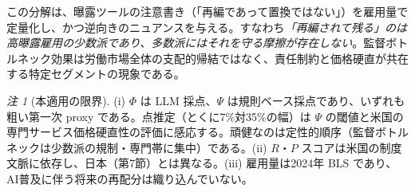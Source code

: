 \documentclass[11pt]{article}
\theoremstyle{plain}
\theoremstyle{definition}
\theoremstyle{remark}
\newtheorem*{rmk}{注}
\begin{document}
この分解は、曝露ツールの注意書き（「再編であって置換ではない」）を雇用量で定量化し、かつ逆向きのニュアンスを与える。すなわち\emph{「再編されて残る」のは高曝露雇用の少数派であり、多数派にはそれを守る摩擦が存在しない}。監督ボトルネック効果は労働市場全体の支配的帰結ではなく、責任制約と価格硬直が共在する特定セグメントの現象である。

\begin{rmk}[本適用の限界]
(i) $\Phi$ は LLM 採点、$\Psi$ は規則ベース採点であり、いずれも粗い第一次 proxy である。点推定（とくに7\%対35\%の幅）は $\Psi$ の閾値と米国の専門サービス価格硬直性の評価に感応する。頑健なのは定性的順序（監督ボトルネックは少数派の規制・専門帯に集中）である。(ii) $R$・$P$ スコアは米国の制度文脈に依存し、日本（第7節）とは異なる。(iii) 雇用量は2024年 BLS であり、AI普及に伴う将来の再配分は織り込んでいない。
\end{rmk}
\end{document}

